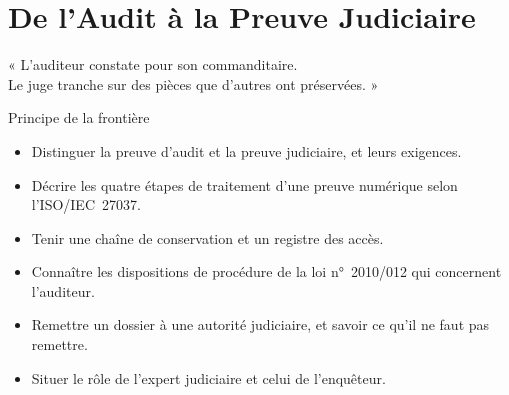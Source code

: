 
\chapter{De l'Audit à la Preuve Judiciaire}
\label{chap:audit-preuve}

\epigraph{%
    « L'auditeur constate pour son commanditaire.\\
    Le juge tranche sur des pièces que d'autres ont préservées. »%
}{Principe de la frontière}


\begin{boxobjectifs}
\begin{itemize}
    \item Distinguer la preuve d'audit et la preuve judiciaire, et leurs
          exigences.
    \item Décrire les quatre étapes de traitement d'une preuve numérique
          selon l'ISO/IEC~27037.
    \item Tenir une chaîne de conservation et un registre des accès.
    \item Connaître les dispositions de procédure de la loi n°~2010/012
          qui concernent l'auditeur.
    \item Remettre un dossier à une autorité judiciaire, et savoir ce
          qu'il ne faut pas remettre.
    \item Situer le rôle de l'expert judiciaire et celui de l'enquêteur.
\end{itemize}
\end{boxobjectifs}

